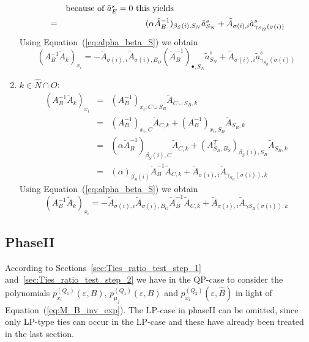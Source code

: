 \documentclass[a4paper]{article}
\newcommand{\pmu}[2]{\ensuremath{p_{\mu_{j}}^{(#1)}(\varepsilon, #2)}}
\begin{document}
\begin{enumerate}
\begin{eqnarray}
  &&\begin{minipage}{9cm}
  because of $\tilde{a}_{E}^{s}=0$ this yields
  \end{minipage}
  \nonumber \\
  &=&
  (\alpha\check{A}_{B}^{-1})_{\beta_{S}(i), S_{N}}\tilde{a}_{S_{N}}^{s}
  + \tilde{A}_{\sigma(i), i}\tilde{a}_{\gamma_{S_{B}}(\sigma(i))}^{s}
  \nonumber  
\end{eqnarray}
Using Equation~(\ref{eq:alpha_beta_S}) we obtain
\begin{equation}
(A_{B}^{-1}\tilde{A}_{k})_{x_{i}} =
-\tilde{A}_{\sigma(i), i}\tilde{A}_{\sigma(i), B_{O}}
\left(\check{A}_{B}^{-1}\right)_{\bullet, S_{N}}\tilde{a}_{S_{N}}^{s}
+\tilde{A}_{\sigma(i), i}\tilde{a}_{\gamma_{S_{B}}(\sigma(i))}^{s} 
\end{equation}
\item $k \in \hat{N} \cap O$:
\begin{eqnarray}
  (A_{B}^{-1}\tilde{A}_{k})_{x_{i}} &=& 
  (A_{B}^{-1})_{x_{i}, C \cup S_{B}}\tilde{A}_{C \cup S_{B}, k}
  \nonumber \\
  &=&
  (A_{B}^{-1})_{x_{i}, C}\tilde{A}_{C, k} +
  (A_{B}^{-1})_{x_{i}, S_{B}}\tilde{A}_{S_{B}, k}
  \nonumber \\
  &=&
  (\alpha\check{A}_{B}^{-1})_{\beta_{S}(i),C}\tilde{A}_{C, k}
  + (A_{S_{B}, B_{S}}^{T})_{\beta_{S}(i), S_{B}}\tilde{A}_{S_{B}, k}
  \nonumber \\
  &=&
  \left(\alpha\right)_{\beta_{S}(i)}\check{A}_{B}^{-1}\tilde{A}_{C,k}
  +\tilde{A}_{\sigma(i),i}\tilde{A}_{\gamma_{S_{B}}(\sigma(i)),k}
  \nonumber
\end{eqnarray}
Using Equation~(\ref{eq:alpha_beta_S}) we obtain
\begin{equation}
  (A_{B}^{-1}\tilde{A}_{k})_{x_{i}} =
  -\tilde{A}_{\sigma(i), i}\tilde{A}_{\sigma(i), B_{O}}
  \check{A}_{B}^{-1}\tilde{A}_{C, k}
  +\tilde{A}_{\sigma(i), i}\tilde{A}_{\gamma{S_{B}}(\sigma(i)), k}
\end{equation}
\end{enumerate}

\subsection{PhaseII}
According to Sections~\ref{sec:Ties_ratio_test_step_1}
and~\ref{sec:Ties_ratio_test_step_2} we have in the QP-case
to consider the polynomials $p_{x_{i}}^{(Q_{1})}(\varepsilon, B)$,
\pmu{Q_{1}}{B} and
$p_{x_{i}}^{(Q_{2})}(\varepsilon, \hat{B})$ in light of
Equation~(\ref{eq:M_B_inv_exp}). The LP-case in phaseII can be omitted,
since only LP-type ties can occur in the LP-case
and these have already been treated in the last section. 
\end{document}
